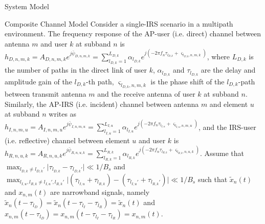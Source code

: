 \documentclass{IEEEtran}
\begin{document}
\begin{section} {System Model}
        \begin{subsection} {Composite Channel Model}
            Consider a single-IRS scenario in a multipath environment. The frequency response of the AP-user (i.e. direct) channel between antenna $m$ and user $k$ at subband $n$ is $h_{D,n,m,k}=A_{D,n,m,k}e^{j\bar{\psi}_{D,n,m,k}}=\sum_{l_{D,k}=1}^{L_{D,k}} \alpha_{l_{D,k}} e^{j\left( -2 \pi f_n \tau_{l_{D,k}}+\varsigma_{l_{D,k},n,m,k} \right)}$, where $L_{D,k}$ is the number of paths in the direct link of user $k$, $\alpha_{l_{D,k}}$ and $\tau_{l_{D,k}}$ are the delay and amplitude gain of the $l_{D,k}$-th path, $\varsigma_{l_{D,k},n,m,k}$ is the phase shift of the $l_{D,k}$-path between transmit antenna $m$ and the receive antenna of user $k$ at subband $n$. Similarly, the AP-IRS (i.e. incident) channel between antenna $m$ and element $u$ at subband $n$ writes as $h_{I,n,m,u}=A_{I,n,m,u}e^{j\bar{\psi}_{I,n,m,u}}=\sum_{l_{I,u}=1}^{L_{I,u}} \alpha_{l_{I,u}} e^{j\left( -2 \pi f_n \tau_{l_{I,u}}+\varsigma_{l_{I,u},n,m,u} \right)}$, and the IRS-user (i.e. reflective) channel between element $u$ and user $k$ is $h_{R,n,u,k}=A_{R,n,u,k}e^{j\bar{\psi}_{R,n,u,k}}=\sum_{l_{R,k}=1}^{L_{R,k}} \alpha_{l_{R,k}} e^{j\left( -2 \pi f_n \tau_{l_{R,k}}+\varsigma_{l_{R,k},n,u,k} \right)}$. Assume that $\max_{l_{D,k} \neq l_{D,k}'} \lvert \tau_{l_{D,k}}-\tau_{l_{D,k}'} \rvert \ll 1/B_s$ and $\max_{l_{I,u},l_{R,k} \neq l_{I,u}',l_{R,k}'} \lvert \left( \tau_{l_{I,u}}+\tau_{l_{R,k}} \right)-\left( \tau_{l_{I,u}'}+\tau_{l_{R,k}'} \right) \rvert \ll 1/B_s$ such that $\tilde{x}_n(t)$ and $x_{n,m}(t)$ are narrowband signals, namely $\tilde{x}_n(t-\tau_{l_D}) = \tilde{x}_n(t-\tau_{l_{I}}-\tau_{l_R}) = \tilde{x}_n(t)$ and $x_{n,m}(t-\tau_{l_D}) = x_{n,m}(t-\tau_{l_{I}}-\tau_{l_R}) = x_{n,m}(t)$.


\end{subsection}
\end{section}
\end{document}

